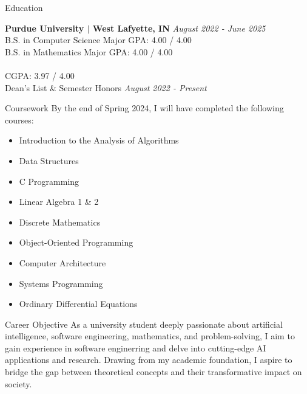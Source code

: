 \documentclass{resume}
\begin{document}
\begin{rSection}{Education}

{\bf Purdue University $\mid$ \small{West Lafyette, IN} } \hfill {\em August 2022 - June 2025} 
\\ B.S. in Computer Science \hfill { Major GPA: 4.00 / 4.00 }
\\ B.S. in Mathematics \hfill { Major GPA: 4.00 / 4.00 }
\\\\ \hspace*{16.22cm} { CGPA: 3.97 / 4.00 }
\\ Dean's List \& Semester Honors \hfill {\em August 2022 - Present}

\end{rSection}

\begin{rSection}{Coursework}
By the end of Spring 2024, I will have completed the following courses:
\footnotesize{
\begin{multicols}{3}
\begin{itemize}
  \item Introduction to the Analysis of Algorithms
  \item Data Structures
  \item C Programming
  \item Linear Algebra 1 \& 2 
  \item Discrete Mathematics
  \item Object-Oriented Programming
  \item Computer Architecture
  \item Systems Programming
  \item Ordinary Differential Equations
\end{itemize}
\end{multicols}
}
\vspace*{-0.5cm}

\end{rSection}

\begin{rSection}{Career Objective}
  \small{As a university student deeply passionate about artificial intelligence, software engineering, mathematics, and problem-solving, I aim to gain experience in software enginerring and delve into cutting-edge AI applications and research. Drawing from my academic foundation, I aspire to bridge the gap between theoretical concepts and their transformative impact on society.}
\end{rSection}
\end{document}
